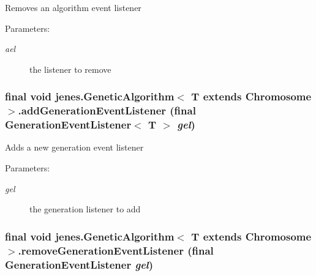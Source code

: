 Removes an algorithm event listener 

\begin{Desc}
\item[Parameters:]
\begin{description}
\item[{\em ael}]the listener to remove \end{description}
\end{Desc}
\hypertarget{classjenes_1_1_genetic_algorithm_3_01_t_01extends_01_chromosome_01_4_a39f1ae905e67a5a3f7d7ad5cb25d276}{
\subsubsection[addGenerationEventListener]{\setlength{\rightskip}{0pt plus 5cm}final void jenes.GeneticAlgorithm$<$ T extends Chromosome $>$.addGenerationEventListener (final GenerationEventListener$<$ T $>$ {\em gel})}}
\label{classjenes_1_1_genetic_algorithm_3_01_t_01extends_01_chromosome_01_4_a39f1ae905e67a5a3f7d7ad5cb25d276}


Adds a new generation event listener 

\begin{Desc}
\item[Parameters:]
\begin{description}
\item[{\em gel}]the generation listener to add \end{description}
\end{Desc}
\hypertarget{classjenes_1_1_genetic_algorithm_3_01_t_01extends_01_chromosome_01_4_33e632148218289d0bc43e202a804bf1}{
\subsubsection[removeGenerationEventListener]{\setlength{\rightskip}{0pt plus 5cm}final void jenes.GeneticAlgorithm$<$ T extends Chromosome $>$.removeGenerationEventListener (final GenerationEventListener {\em gel})}}
\label{classjenes_1_1_genetic_algorithm_3_01_t_01extends_01_chromosome_01_4_33e632148218289d0bc43e202a804bf1}


